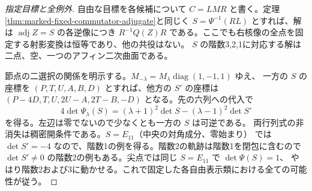 \begin{proof}[指定目標と全例外]
自由な目標を各候補について $C=L M R$ と書く。定理\ref{thm:marked-fixed-commutator-adjugate}と同じく
$S=\Psi^{-1}(RL)$ とすれば、解は $\operatorname{adj}Z=S$ の各逆像につき
$R^{-1}Q(Z)R$ である。ここでも右核像の全点を固定する射影変換は恒等であり、他の共役はない。
$S$ の階数3,2,1に対応する解は二点、空、一つのアフィン二次曲面である。

節点の二選択の関係を明示する。$M_{-\lambda}=M_\lambda\operatorname{diag}(1,-1,1)$ ゆえ、
一方の $S$ の座標を $(P,T,U,A,B,D)$ とすれば、他方の $S'$ の座標は
$(P-4D,T,U,2U-A,2T-B,-D)$ となる。先の六列への代入で
\[
          4\det\Psi_\lambda(S)=(\lambda+1)^2\det S-(\lambda-1)^2\det S'
\]
を得る。左辺は零でないので少なくとも一方の $S$ は可逆である。
両行列式の非消失は稠密開条件である。$S=E_{11}$（中央の対角成分、零始まり）
では $\det S'=-4$ なので、階数1の例を得る。階数2の軌跡は階数1を閉包に含むので
$\det S'\ne0$ の階数2の例もある。尖点では同じ $S=E_{11}$ で $\det\Psi(S)=1$、
やはり階数2および3に動かせる。これで固定した各自由表示類における全ての可能性が従う。
\end{proof}
